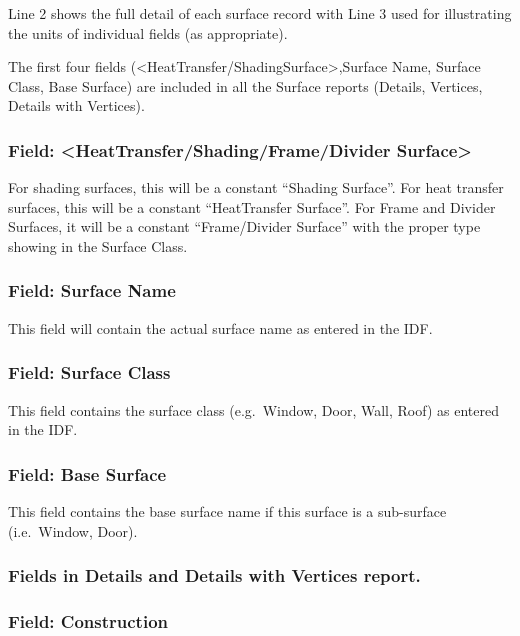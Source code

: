 Line 2 shows the full detail of each surface record with Line 3 used for illustrating the units of individual fields (as appropriate).

The first four fields (\textless{}HeatTransfer/ShadingSurface\textgreater{},Surface Name, Surface Class, Base Surface) are included in all the Surface reports (Details, Vertices, Details with Vertices).

\subsubsection{Field: \textless{}HeatTransfer/Shading/Frame/Divider Surface\textgreater{}}\label{field-heattransfershadingframedividerux5fsurface}

For shading surfaces, this will be a constant ``Shading Surface''. For heat transfer surfaces, this will be a constant ``HeatTransfer Surface''. For Frame and Divider Surfaces, it will be a constant ``Frame/Divider Surface'' with the proper type showing in the Surface Class.

\subsubsection{Field: Surface Name}\label{field-surface-name}

This field will contain the actual surface name as entered in the IDF.

\subsubsection{Field: Surface Class}\label{field-surface-class}

This field contains the surface class (e.g.~Window, Door, Wall, Roof) as entered in the IDF.

\subsubsection{Field: Base Surface}\label{field-base-surface}

This field contains the base surface name if this surface is a sub-surface (i.e.~Window, Door).

\subsubsection{Fields in Details and Details with Vertices report.}\label{fields-in-details-and-details-with-vertices-report.}

\subsubsection{Field: Construction}\label{field-construction}

